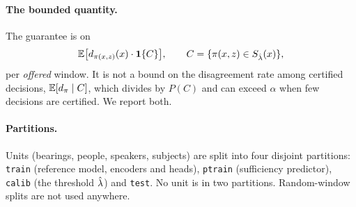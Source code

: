 \paragraph{The bounded quantity.} The guarantee is on
\begin{equation}
  \mathbb{E}\bigl[d_{\pi(x,z)}(x)\cdot \mathbf{1}\{C\}\bigr], \qquad C = \{\pi(x,z) \in S_{\hat\lambda}(x)\},
  \label{eq:bounded}
\end{equation}
per \emph{offered} window. It is not a bound on the disagreement rate among certified decisions,
$\mathbb{E}[d_\pi \mid C]$, which divides by $P(C)$ and can exceed $\alpha$ when few decisions are
certified. We report both.

\paragraph{Partitions.} Units (bearings, people, speakers, subjects) are split into four disjoint
partitions: \texttt{train} (reference model, encoders and heads), \texttt{ptrain} (sufficiency
predictor), \texttt{calib} (the threshold $\hat\lambda$) and \texttt{test}. No unit is in two partitions.
Random-window splits are not used anywhere.
